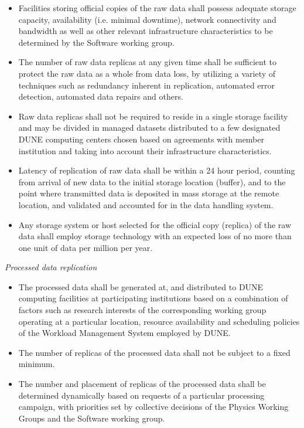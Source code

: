 \begin{itemize}
\item Facilities storing official copies of the raw data shall possess adequate storage capacity, availability (i.e. minimal downtime),
network connectivity and bandwidth as well as other relevant infrastructure characteristics to be determined by the Software working group.

\item The number of raw data replicas at any given time shall be sufficient to protect the raw data as a whole from data loss,
by utilizing a variety of techniques such as redundancy inherent in replication, automated error detection, automated data repairs and others.

\item Raw data replicas shall not be required to reside in a single storage facility and may be divided in managed datasets distributed to a few designated DUNE computing centers chosen based on agreements with member institution and taking into account their infrastructure characteristics.

\item Latency of replication of raw data shall be within a 24 hour period, counting from arrival of new data to the initial storage location (buffer), and to the point where transmitted data is deposited in mass storage at the remote location, and validated and accounted for in the data handling system.

\item Any storage system or host selected for the official copy (replica) of the raw data shall employ storage technology with an expected loss of no more than one unit of data per million per year.

\end{itemize}
\textit{Processed data replication}
\begin{itemize}

\item The processed data shall be generated at, and distributed to DUNE computing facilities at participating institutions 
based on a combination of factors such as research interests of the corresponding working group operating at a particular location, 
resource availability and scheduling policies of the Workload Management System employed by DUNE.

\item The number of replicas of the processed data shall not be subject to a fixed minimum. 

\item The number and placement of replicas of the processed data shall be determined dynamically based on requests of a particular processing campaign, with priorities set by collective decisions of the Physics Working Groups and the Software working group.
\end{itemize}

